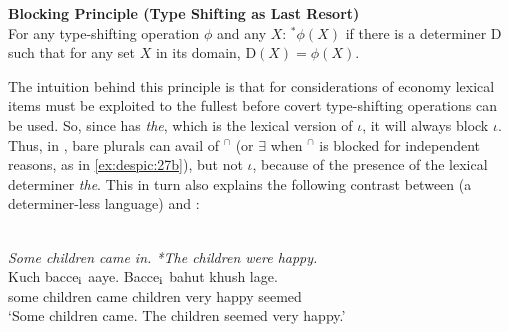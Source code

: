 \documentclass[output=paper,
modfonts
]{langscibook}
\begin{document}
	\ea \label{ex:despic:30}
	\textbf{Blocking Principle (Type Shifting as Last Resort)} \\
	For any type-shifting operation $\phi$ and any $X$: $^{*}\phi(X)$ if there is a determiner D such that for any set $X$ in its domain, D$(X)=\phi(X)$.  \citep[216]{Dayal2004}
	\z
	
	The intuition behind this principle is that for considerations of economy lexical items must be exploited to the fullest before covert type-shifting operations can be used. So, since  has \textit{the}, which is the lexical version of $\iota$, it will always block $\iota$. Thus, in , bare plurals can
	avail of $^\cap$ (or $\exists$ when $^\cap$ is blocked for independent reasons, as in \ref{ex:despic:27b}), but not $\iota$, because of the
	presence of the lexical determiner \textit{the}. This in turn also explains the following contrast between  (a determiner-less language) and  \citep[417]{Dayal2004}:
	
	\ea \label{ex:despic:31}
	\ea \label{ex:despic:31a}
	 \\ 
	\textit{Some children came in. \textnormal{*}{\op}The{\cp} children were happy.}
	\ex \label{ex:despic:31b}
	 \\
	\gll 
	{Kuch} {bacce$_\text{\textnormal{i}}$} {aaye}. {Bacce$_\text{\textnormal{i}}$} {bahut} {khush} {lage.} \\
	some children came children very happy seemed \\ 
	\glt `Some children came. The children seemed very happy.' 
	\z 
	\z 
	
\end{document}
